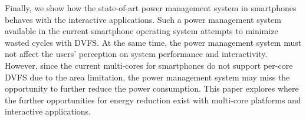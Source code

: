 Finally, we show how the state-of-art power management system in smartphones behaves with 
the interactive applications. Such a power management system available in the current smartphone operating system
attempts to minimize wasted cycles with DVFS. At the same time, the power management system must not affect the users' perception
on system performance and interactivity. However, since the current multi-cores for smartphones do not support per-core
DVFS due to the area limitation, the power management system may miss the opportunity to further 
reduce the power consumption. This paper explores where the further opportunities for energy reduction exist with
multi-core platforms and interactive applications.


